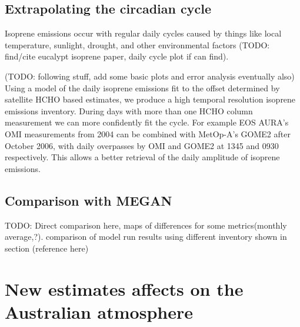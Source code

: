  \subsection{Extrapolating the circadian cycle}
    Isoprene emissions occur with regular daily cycles caused by things like local temperature, sunlight, drought, and other environmental factors (TODO: find/cite eucalypt isoprene paper, daily cycle plot if can find).
    
    (TODO: following stuff, add some basic plots and error analysis eventually also)
    Using a model of the daily isoprene emissions fit to the offset determined by satellite HCHO based estimates, we produce a high temporal resolution isoprene emissions inventory.
    During days with more than one HCHO column measurement we can more confidently fit the cycle. 
    For example EOS AURA's OMI measurements from 2004 can be combined with MetOp-A's GOME2 after October 2006, with daily overpasses by OMI and GOME2 at 1345 and 0930 respectively.
    This allows a better retrieval of the daily amplitude of isoprene emissions.
    
  \subsection{Comparison with MEGAN}
    TODO: Direct comparison here, maps of differences for some metrics(monthly average,?). comparison of model run results using different inventory shown in section (reference here)

\section{New estimates affects on the Australian atmosphere}

